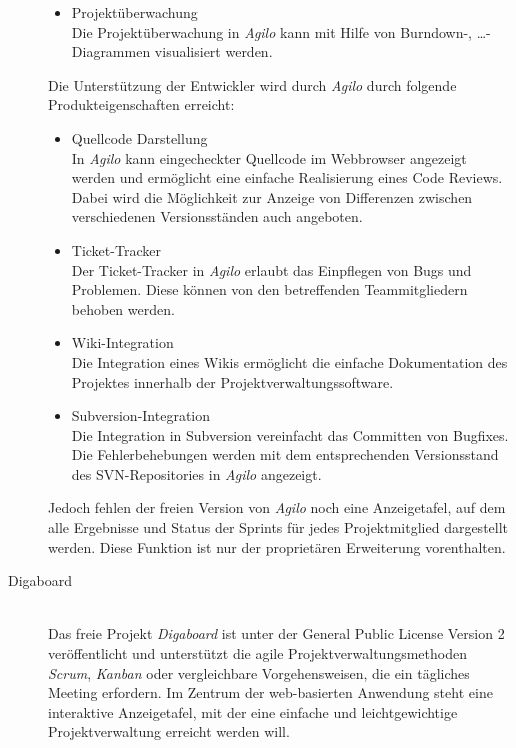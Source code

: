 \begin{description}
\begin{itemize}
\item Projektüberwachung\\
Die Projektüberwachung in \emph{Agilo} kann mit Hilfe von Burndown-, \dots -Diagrammen visualisiert werden.

\end{itemize}

Die Unterstützung der Entwickler wird durch \emph{Agilo} durch folgende Produkteigenschaften erreicht:
\begin{itemize}
\item Quellcode Darstellung\\
In \emph{Agilo} kann eingecheckter Quellcode im Webbrowser angezeigt werden und ermöglicht eine einfache Realisierung eines Code Reviews. Dabei wird die Möglichkeit zur Anzeige von Differenzen zwischen verschiedenen Versionsständen auch angeboten. 

\item Ticket-Tracker\\
Der Ticket-Tracker in \emph{Agilo} erlaubt das Einpflegen von Bugs und Problemen. Diese können von den betreffenden Teammitgliedern behoben werden.

\item Wiki-Integration\\
Die Integration eines Wikis ermöglicht die einfache Dokumentation des Projektes innerhalb der Projektverwaltungssoftware.

\item Subversion-Integration\\
Die Integration in Subversion vereinfacht das Committen von Bugfixes. Die Fehlerbehebungen werden mit dem entsprechenden Versionsstand des SVN-Repositories in \emph{Agilo} angezeigt.
\end{itemize}

Jedoch fehlen der freien Version von \emph{Agilo} noch eine Anzeigetafel, auf dem alle Ergebnisse und Status der Sprints für jedes Projektmitglied dargestellt werden. Diese Funktion ist nur der proprietären Erweiterung vorenthalten. \cite{bib:agilo} \\

\item[Digaboard]\hspace*{1em}\\
Das freie Projekt \emph{Digaboard} ist unter der General Public License Version 2 veröffentlicht und unterstützt die agile Projektverwaltungsmethoden \emph{Scrum}, \emph{Kanban} oder vergleichbare Vorgehensweisen, die ein tägliches Meeting erfordern. Im Zentrum der web-basierten Anwendung steht eine interaktive Anzeigetafel, mit der eine einfache und leichtgewichtige Projektverwaltung erreicht werden will.


\end{description}
